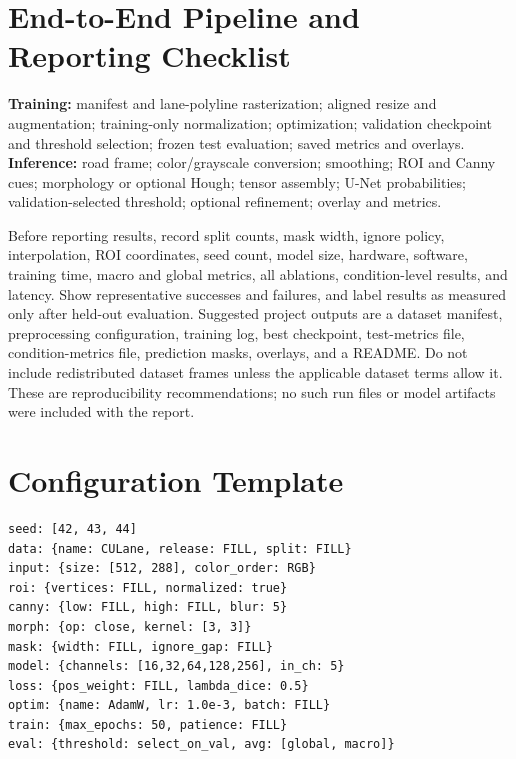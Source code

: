 \documentclass[10pt,a4paper,twocolumn]{article}
\begin{document}
\section{End-to-End Pipeline and Reporting Checklist}
\textbf{Training:} manifest and lane-polyline rasterization; aligned resize and augmentation; training-only normalization; optimization; validation checkpoint and threshold selection; frozen test evaluation; saved metrics and overlays. \textbf{Inference:} road frame; color/grayscale conversion; smoothing; ROI and Canny cues; morphology or optional Hough; tensor assembly; U-Net probabilities; validation-selected threshold; optional refinement; overlay and metrics.

Before reporting results, record split counts, mask width, ignore policy, interpolation, ROI coordinates, seed count, model size, hardware, software, training time, macro and global metrics, all ablations, condition-level results, and latency. Show representative successes and failures, and label results as measured only after held-out evaluation. Suggested project outputs are a dataset manifest, preprocessing configuration, training log, best checkpoint, test-metrics file, condition-metrics file, prediction masks, overlays, and a README. Do not include redistributed dataset frames unless the applicable dataset terms allow it. These are reproducibility recommendations; no such run files or model artifacts were included with the report.

\section{Configuration Template}
\begin{lstlisting}
seed: [42, 43, 44]
data: {name: CULane, release: FILL, split: FILL}
input: {size: [512, 288], color_order: RGB}
roi: {vertices: FILL, normalized: true}
canny: {low: FILL, high: FILL, blur: 5}
morph: {op: close, kernel: [3, 3]}
mask: {width: FILL, ignore_gap: FILL}
model: {channels: [16,32,64,128,256], in_ch: 5}
loss: {pos_weight: FILL, lambda_dice: 0.5}
optim: {name: AdamW, lr: 1.0e-3, batch: FILL}
train: {max_epochs: 50, patience: FILL}
eval: {threshold: select_on_val, avg: [global, macro]}
\end{lstlisting}
\end{document}
